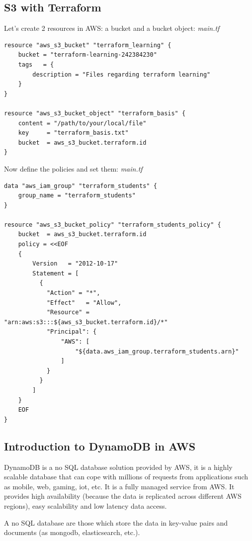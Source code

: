 \documentclass{article}
\newenvironment{codetemplate}[1][]{%
  \mybasecolorbox[#1]
  \itshape
}{%
  \endmybasecolorbox
}
\begin{document}
\subsection{S3 with Terraform}
Let's create 2 resources in AWS: a bucket and a bucket object:
\begin{codetemplate}{main.tf}
\begin{verbatim}
resource "aws_s3_bucket" "terraform_learning" {
    bucket = "terraform-learning-242384230"
    tags   = {
        description = "Files regarding terraform learning"
    }
}

resource "aws_s3_bucket_object" "terraform_basis" {
    content = "/path/to/your/local/file"
    key     = "terraform_basis.txt"
    bucket  = aws_s3_bucket.terraform.id
}
\end{verbatim}
\end{codetemplate}

Now define the policies and set them:
\begin{codetemplate}{main.tf}
\begin{verbatim}
data "aws_iam_group" "terraform_students" {
    group_name = "terraform_students"
}

resource "aws_s3_bucket_policy" "terraform_students_policy" {
    bucket  = aws_s3_bucket.terraform.id
    policy = <<EOF
    {
        Version   = "2012-10-17"
        Statement = [
          {
            "Action" = "*",
            "Effect"   = "Allow",
            "Resource" = "arn:aws:s3:::${aws_s3_bucket.terraform.id}/*"
            "Principal": {
                "AWS": [
                    "${data.aws_iam_group.terraform_students.arn}"
                ]
            }
          }
        ]
    }
    EOF
}
\end{verbatim}
\end{codetemplate}

\subsection{Introduction to DynamoDB in AWS}
DynamoDB is a no SQL database solution provided by AWS, it is a highly scalable database that can cope with millions of requests from applications such as mobile, web, gaming, iot, etc. It is a fully managed service from AWS. It provides high availability (because the data is replicated across different AWS regions), easy scalability and low latency data access. 

A no SQL database are those which store the data in key-value pairs and documents (as mongodb, elasticsearch, etc.). 
\end{document}

